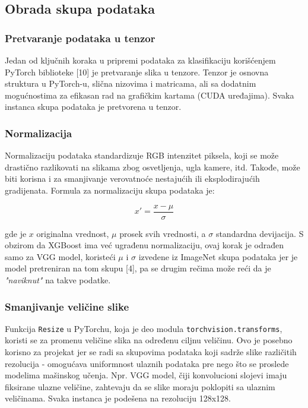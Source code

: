 \documentclass{article}
\begin{document}
\subsection{Obrada skupa podataka}

\subsubsection{Pretvaranje podataka u tenzor}

Jedan od ključnih koraka u pripremi podataka za klasifikaciju korišćenjem PyTorch biblioteke [10] je pretvaranje slika u tenzore. Tenzor je osnovna struktura u PyTorch-u, slična nizovima i matricama, ali sa dodatnim mogućnostima za efikasan rad na grafičkim kartama (CUDA uređajima). Svaka instanca skupa podataka je pretvorena u tenzor.

\subsubsection{Normalizacija}
\par
Normalizaciju podataka standardizuje RGB intenzitet piksela, koji se može drastično razlikovati na slikama zbog osvetljenja, ugla kamere, itd. Takođe, može biti korisna i za smanjivanje verovatnoće nestajućih ili eksplodirajućih gradijenata. Formula za normalizaciju skupa podataka je:

\[
x' = \frac{x - \mu}{\sigma}
\]

gde je \( x \) originalna vrednost, \( \mu \) prosek svih vrednosti, a \( \sigma \) standardna devijacija. S obzirom da XGBoost ima već ugrađenu normalizaciju, ovaj korak je odrađen samo za VGG model, koristeći \( \mu \) i \( \sigma \) izvedene iz ImageNet skupa podataka jer je model pretreniran na tom skupu [4], pa se drugim rečima može reći da je \textit{"naviknut"} na takve podatke.

\subsubsection{Smanjivanje veličine slike}
Funkcija \texttt{Resize} u PyTorchu, koja je deo modula \texttt{torchvision.transforms}, koristi se za promenu veličine slika na određenu ciljnu veličinu. Ovo je posebno korisno za projekat jer se radi sa skupovima podataka koji sadrže slike različitih rezolucija - omogućava uniformnost ulaznih podataka pre nego što se proslede modelima mašinskog učenja. Npr. VGG model, čiji konvolucioni slojevi imaju fiksirane ulazne veličine, zahtevaju da se slike moraju poklopiti sa ulaznim veličinama. Svaka instanca je podešena na rezoluciju 128x128.
\end{document}
